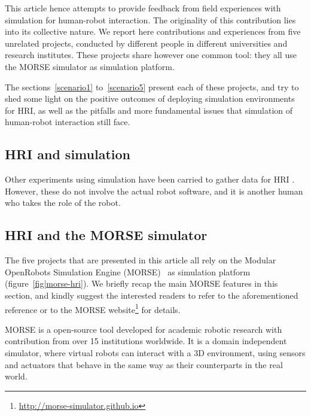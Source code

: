 \documentclass[conference]{IEEEtran}
\begin{document}

This article hence attempts to provide feedback from field experiences with simulation for human-robot interaction. The originality of this contribution lies into its collective nature. We report here contributions and experiences from five unrelated projects, conducted by different people in different universities and research institutes. These projects share however one common tool: they all use the MORSE simulator as simulation platform.

The sections~\ref{scenario1} to~\ref{scenario5} present each of these projects, and try to shed some light on the positive outcomes of deploying simulation environments for HRI, as well as the pitfalls and more fundamental issues that simulation of human-robot interaction still face.

\subsection*{HRI and simulation}


Other experiments using simulation have been carried to gather data for HRI
\cite{Chernova2011}. However, these do not involve the actual robot software,
and it is another human who takes the role of the robot.

\subsection*{HRI and the MORSE simulator}

The five projects that are presented in this article all rely on the Modular OpenRobots Simulation Engine
(MORSE)~\cite{Echeverria2011, morse_simpar_2012} as simulation platform (figure~\ref{fig|morse-hri}). We briefly recap the main MORSE features in this
section, and kindly suggest the interested readers to refer to the aforementioned reference or to the
MORSE website\footnote{\url{http://morse-simulator.github.io}} for details.

MORSE is a open-source tool developed for academic robotic research with contribution from over 15
institutions worldwide. It is a domain independent simulator, where virtual robots can interact with a 
3D environment, using sensors and actuators that behave in the same way as their counterparts in the
real world.
\end{document}
